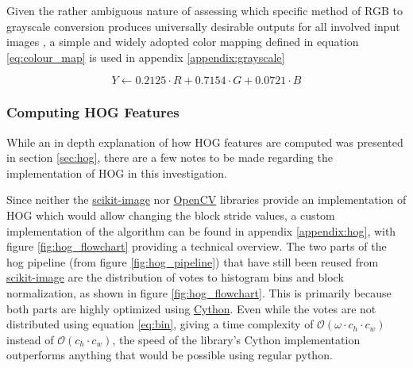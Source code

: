 Given the rather ambiguous nature of assessing which specific method of RGB to grayscale conversion produces universally desirable outputs for all involved input images \cite{madk_2008_perceptual}, a simple and widely adopted color mapping defined in equation \ref{eq:colour_map} is used in appendix \ref{appendix:grayscale}

\begin{equation}\label{eq:colour_map}
    Y \leftarrow 0.2125 \cdot R + 0.7154 \cdot G + 0.0721 \cdot B
\end{equation}

\subsubsection{Computing HOG Features}

While an in depth explanation of how HOG features are computed was presented in section \ref{sec:hog}, there are a few notes to be made regarding the implementation of HOG in this investigation.

Since neither the \href{https://scikit-image.org/}{scikit-image} nor \href{https://opencv.org/}{OpenCV} libraries provide an implementation of HOG which would allow changing the block stride values, a custom implementation of the algorithm can be found in appendix \ref{appendix:hog}, with figure \ref{fig:hog_flowchart} providing a technical overview. The two parts of the hog pipeline (from figure \ref{fig:hog_pipeline}) that have still been reused from \href{https://scikit-image.org/}{scikit-image} are the distribution of votes to histogram bins and block normalization, as shown in figure \ref{fig:hog_flowchart}. This is primarily because both parts are highly optimized using \href{https://cython.org/}{Cython}. Even while the votes are not distributed using equation \ref{eq:bin}, giving a time complexity of $\mathcal{O}(\omega \cdot c_h \cdot c_w)$ instead of $\mathcal{O}(c_h \cdot c_w)$, the speed of the library's Cython implementation outperforms anything that would be possible using regular python.

